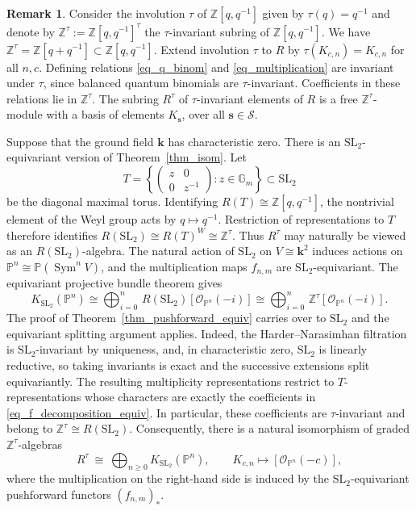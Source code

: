 \documentclass{article}
\def\Z{\mathbb Z}
\newcommand{\kk}{\mathbf{k}}
\newcommand{\mcO}{\mathcal{O}}
\newcommand{\mcS}{\mathcal{S}}
\newcommand{\mbs}{\mathbf{s}}
\newcommand{\PP}{\mathbb{P}}
\theoremstyle{definition}
\newtheorem{remark}[thm]{Remark}
\theoremstyle{definition}
\begin{document}
\begin{remark} \label{rmk_sl2}
Consider the involution $\tau$ of $\Z[q,q^{-1}]$ given by  $\tau(q)=q^{-1}$ and denote by $\Z^{\tau}:=\Z[q,q^{-1}]^{\tau}$ the $\tau$-invariant subring of $\Z[q,q^{-1}]$. We have $\Z^{\tau}= \Z[q+q^{-1}]\subset \Z[q,q^{-1}]$.
Extend involution $\tau$ to $R$ by $\tau(K_{c,n})=K_{c,n}$ for all $n,c$. Defining relations \eqref{eq_q_binom} and \eqref{eq_multiplication} are invariant under $\tau$, since balanced quantum binomials are $\tau$-invariant. Coefficients in these relations lie in $\Z^{\tau}$.
The subring $R^{\tau}$ of $\tau$-invariant elements of $R$ is a free $\Z^{\tau}$-module with a basis of elements $K_{\mbs}$, over all $\mbs\in\mcS$.

\vspace{0.07in}

Suppose that the ground field $\kk$ has characteristic zero.
There is an $\mathrm{SL}_2$-equivariant version of Theorem~\ref{thm_isom}.
Let
\[
T= \left\{ \begin{pmatrix} z&0\\ 0&z^{-1} \end{pmatrix} :z\in\mathbb G_m \right\} \subset \mathrm{SL}_2 \]
be the diagonal maximal torus. Identifying $R(T)\cong\Z[q,q^{-1}]$, the nontrivial element of the Weyl group acts by $q\mapsto q^{-1}$.
Restriction of representations to $T$ therefore identifies
$ R(\mathrm{SL}_2) \cong R(T)^W \cong \Z^\tau. $
Thus $R^\tau$ may naturally be viewed as an $R(\mathrm{SL}_2)$-algebra.
The natural action of $\mathrm{SL}_2$ on $V\cong\kk^2$ induces actions on $ \PP^n\cong \PP(\operatorname{Sym}^n V)$,
and the multiplication maps $ f_{n,m}$ are $\mathrm{SL}_2$-equivariant. The equivariant projective bundle theorem gives
\[
K_{\mathrm{SL}_2}(\PP^n) \cong \bigoplus_{i=0}^n \, R(\mathrm{SL}_2)[\mcO_{\PP^n}(-i)] \cong \bigoplus_{i=0}^n \, \Z^{\tau}[\mcO_{\PP^n}(-i)].
\]
The proof of Theorem~\ref{thm_pushforward_equiv} carries over to $\mathrm{SL}_2$ and  the equivariant splitting argument applies. Indeed, the Harder--Narasimhan filtration is $\mathrm{SL}_2$-invariant by uniqueness, and, in characteristic zero, $\mathrm{SL}_2$
is linearly reductive, so taking invariants is exact and the successive extensions split equivariantly.
The resulting multiplicity representations restrict to $T$-representations whose characters are exactly the coefficients in \eqref{eq_f_decomposition_equiv}.
In particular, these coefficients are $\tau$-invariant and belong to $\Z^{\tau}\cong R(\mathrm{SL}_2).$
Consequently, there is a natural isomorphism of graded $\Z^\tau$-algebras
\begin{equation} \label{eq_iso_SL2}
R^\tau \ \cong\ \bigoplus_{n\geq0}K_{\mathrm{SL}_2}(\PP^n), \qquad K_{c,n}\longmapsto[\mcO_{\PP^n}(-c)],
\end{equation}
where the multiplication on the right-hand side is induced by the $\mathrm{SL}_2$-equivariant pushforward functors $(f_{n,m})_*$. \end{remark}
\end{document}
